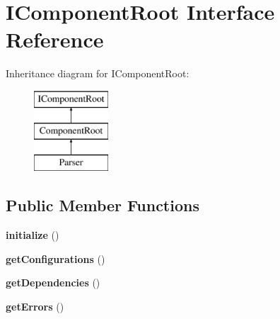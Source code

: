 \hypertarget{interface_utopia_1_1_components_1_1_core_1_1_i_component_root}{
\section{IComponentRoot Interface Reference}
\label{interface_utopia_1_1_components_1_1_core_1_1_i_component_root}
}
Inheritance diagram for IComponentRoot:\begin{figure}[H]
\begin{center}
\leavevmode
\includegraphics[height=3.000000cm]{interface_utopia_1_1_components_1_1_core_1_1_i_component_root}
\end{center}
\end{figure}
\subsection*{Public Member Functions}
\begin{DoxyCompactItemize}
\item 
\hypertarget{interface_utopia_1_1_components_1_1_core_1_1_i_component_root_a91098fa7d1917ce4833f284bbef12627}{
{\bfseries initialize} ()}
\label{interface_utopia_1_1_components_1_1_core_1_1_i_component_root_a91098fa7d1917ce4833f284bbef12627}

\item 
\hypertarget{interface_utopia_1_1_components_1_1_core_1_1_i_component_root_a55ad87c7b53d1748156bb15250d26e02}{
{\bfseries getConfigurations} ()}
\label{interface_utopia_1_1_components_1_1_core_1_1_i_component_root_a55ad87c7b53d1748156bb15250d26e02}

\item 
\hypertarget{interface_utopia_1_1_components_1_1_core_1_1_i_component_root_a4f0d16046ea95ab73fa42d2aec2d1057}{
{\bfseries getDependencies} ()}
\label{interface_utopia_1_1_components_1_1_core_1_1_i_component_root_a4f0d16046ea95ab73fa42d2aec2d1057}

\item 
\hypertarget{interface_utopia_1_1_components_1_1_core_1_1_i_component_root_a6e548ebf2656742bfd19939ead923ed2}{
{\bfseries getErrors} ()}
\label{interface_utopia_1_1_components_1_1_core_1_1_i_component_root_a6e548ebf2656742bfd19939ead923ed2}

\end{DoxyCompactItemize}

